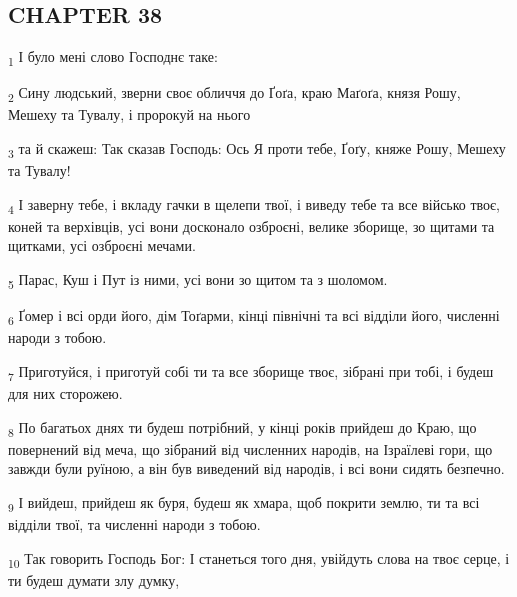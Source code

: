\subsection{CHAPTER 38}
\begin{tcolorbox}
\textsubscript{1} І було мені слово Господнє таке:
\end{tcolorbox}
\begin{tcolorbox}
\textsubscript{2} Сину людський, зверни своє обличчя до Ґоґа, краю Маґоґа, князя Рошу, Мешеху та Тувалу, і пророкуй на нього
\end{tcolorbox}
\begin{tcolorbox}
\textsubscript{3} та й скажеш: Так сказав Господь: Ось Я проти тебе, Ґоґу, княже Рошу, Мешеху та Тувалу!
\end{tcolorbox}
\begin{tcolorbox}
\textsubscript{4} І заверну тебе, і вкладу гачки в щелепи твої, і виведу тебе та все військо твоє, коней та верхівців, усі вони досконало озброєні, велике зборище, зо щитами та щитками, усі озброєні мечами.
\end{tcolorbox}
\begin{tcolorbox}
\textsubscript{5} Парас, Куш і Пут із ними, усі вони зо щитом та з шоломом.
\end{tcolorbox}
\begin{tcolorbox}
\textsubscript{6} Ґомер і всі орди його, дім Тоґарми, кінці північні та всі відділи його, численні народи з тобою.
\end{tcolorbox}
\begin{tcolorbox}
\textsubscript{7} Приготуйся, і приготуй собі ти та все зборище твоє, зібрані при тобі, і будеш для них сторожею.
\end{tcolorbox}
\begin{tcolorbox}
\textsubscript{8} По багатьох днях ти будеш потрібний, у кінці років прийдеш до Краю, що повернений від меча, що зібраний від численних народів, на Ізраїлеві гори, що завжди були руїною, а він був виведений від народів, і всі вони сидять безпечно.
\end{tcolorbox}
\begin{tcolorbox}
\textsubscript{9} І вийдеш, прийдеш як буря, будеш як хмара, щоб покрити землю, ти та всі відділи твої, та численні народи з тобою.
\end{tcolorbox}
\begin{tcolorbox}
\textsubscript{10} Так говорить Господь Бог: І станеться того дня, увійдуть слова на твоє серце, і ти будеш думати злу думку,
\end{tcolorbox}
